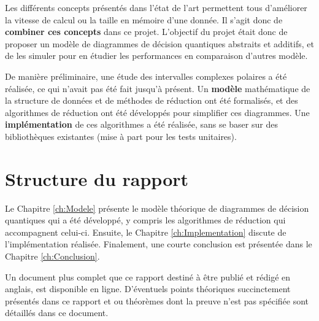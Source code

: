 Les différents concepts présentés dans l'état de l'art permettent tous d'améliorer la vitesse de calcul ou la taille en mémoire d'une donnée. Il s'agit donc de \textbf{combiner ces concepts} dans ce projet. L'objectif du projet était donc de proposer un modèle de diagrammes de décision quantiques abstraits et additifs, et de les simuler pour en étudier les performances en comparaison d'autres modèle.

De manière préliminaire, une étude des intervalles complexes polaires a été réalisée, ce qui n'avait pas été fait jusqu'à présent.
Un \textbf{modèle} mathématique de la structure de données et de méthodes de réduction ont été formalisés, et des algorithmes de réduction ont été développés pour simplifier ces diagrammes. Une \textbf{implémentation} de ces algorithmes a été réalisée, sans se baser sur des bibliothèques existantes (mise à part pour les tests unitaires).

\section{Structure du rapport}
\label{sec:Structure}

Le Chapitre \ref{ch:Modele} présente le modèle théorique de diagrammes de décision quantiques qui a été développé, y compris les algorithmes de réduction qui accompagnent celui-ci. Ensuite, le Chapitre \ref{ch:Implementation} discute de l'implémentation réalisée. Finalement, une courte conclusion est présentée dans le Chapitre \ref{ch:Conclusion}.

Un document plus complet que ce rapport destiné à être publié et rédigé en anglais, est disponible en ligne. \cite{Leroy_2024} D'éventuels points théoriques succinctement présentés dans ce rapport et ou théorèmes dont la preuve n'est pas spécifiée sont détaillés dans ce document.

